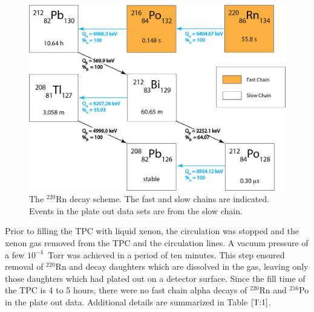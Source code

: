 \begin{figure}[ht]
    \centering
    \includegraphics[width=5.0in]{figures/radon/220Rn_simple_fastslowchains.png}
    \caption{The $^{220}$Rn decay scheme. The fast and slow chains are indicated. Events in the plate out data sets are from the slow chain.}
    \label{fig:Rn220}
\end{figure}

Prior to filling the TPC with liquid xenon, the circulation was stopped and the xenon gas removed from the TPC and the circulation lines. A vacuum pressure of a few $10^{-4}$~Torr was achieved in a period of ten minutes. This step ensured removal of $^{220}$Rn and decay daughters which are dissolved in the gas, leaving only those daughters which had plated out on a detector surface. Since the fill time of the TPC is 4 to 5 hours, there were no fast chain alpha decays of $^{220}$Rn and $^{216}$Po in the plate out data. Additional details are summarized in Table $\ref{T:1}$.

